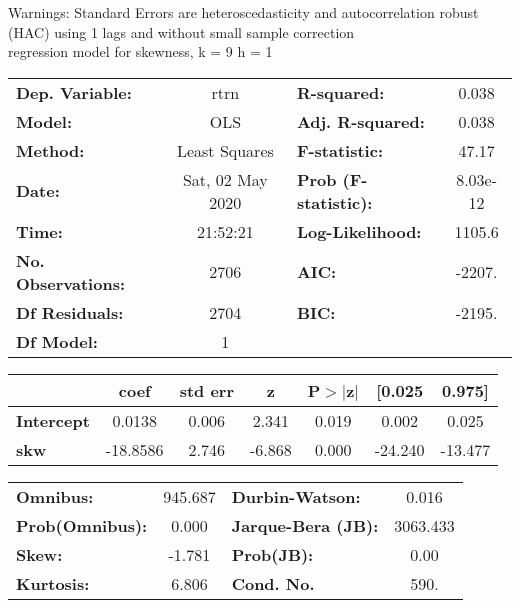 Warnings: \newline
 [1] Standard Errors are heteroscedasticity and autocorrelation robust (HAC) using 1 lags and without small sample correction\\ 

regression model for skewness, k = 9 h = 1\begin{center}
\begin{tabular}{lclc}
\toprule
\textbf{Dep. Variable:}    &       rtrn       & \textbf{  R-squared:         } &     0.038   \\
\textbf{Model:}            &       OLS        & \textbf{  Adj. R-squared:    } &     0.038   \\
\textbf{Method:}           &  Least Squares   & \textbf{  F-statistic:       } &     47.17   \\
\textbf{Date:}             & Sat, 02 May 2020 & \textbf{  Prob (F-statistic):} &  8.03e-12   \\
\textbf{Time:}             &     21:52:21     & \textbf{  Log-Likelihood:    } &    1105.6   \\
\textbf{No. Observations:} &        2706      & \textbf{  AIC:               } &    -2207.   \\
\textbf{Df Residuals:}     &        2704      & \textbf{  BIC:               } &    -2195.   \\
\textbf{Df Model:}         &           1      & \textbf{                     } &             \\
\bottomrule
\end{tabular}
\begin{tabular}{lcccccc}
                   & \textbf{coef} & \textbf{std err} & \textbf{z} & \textbf{P$> |$z$|$} & \textbf{[0.025} & \textbf{0.975]}  \\
\midrule
\textbf{Intercept} &       0.0138  &        0.006     &     2.341  &         0.019        &        0.002    &        0.025     \\
\textbf{skw}       &     -18.8586  &        2.746     &    -6.868  &         0.000        &      -24.240    &      -13.477     \\
\bottomrule
\end{tabular}
\begin{tabular}{lclc}
\textbf{Omnibus:}       & 945.687 & \textbf{  Durbin-Watson:     } &    0.016  \\
\textbf{Prob(Omnibus):} &   0.000 & \textbf{  Jarque-Bera (JB):  } & 3063.433  \\
\textbf{Skew:}          &  -1.781 & \textbf{  Prob(JB):          } &     0.00  \\
\textbf{Kurtosis:}      &   6.806 & \textbf{  Cond. No.          } &     590.  \\
\bottomrule
\end{tabular}
\end{center}

